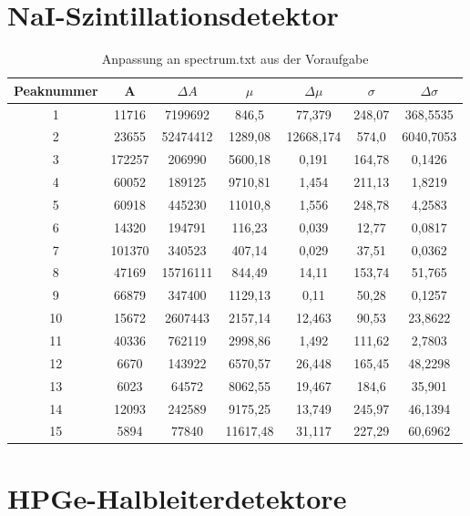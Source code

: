 \documentclass{article}
\begin{document}
\section{NaI-Szintillationsdetektor}

\begin{table}
  \centering
  \begin{tabular}{|c|c|c|c|c|c|c|} \hline
    Peaknummer & A & $\Delta A$ & $\mu$ & $\Delta \mu$ & $\sigma$ & $\Delta \sigma$\\ \hline \hline
    1 & 11716 & 7199692 & 846,5 & 77,379 & 248,07 & 368,5535 \\ \hline
    2 & 23655 & 52474412 & 1289,08 & 12668,174 & 574,0 & 6040,7053 \\ \hline
    3 & 172257 & 206990 & 5600,18 & 0,191 & 164,78 & 0,1426 \\ \hline
    4 & 60052 & 189125 & 9710,81 & 1,454 & 211,13 & 1,8219 \\ \hline
    5 & 60918 & 445230 & 11010,8 & 1,556 & 248,78 & 4,2583 \\ \hline
    6 & 14320 & 194791 & 116,23 & 0,039 & 12,77 & 0,0817 \\ \hline
    7 & 101370 & 340523 & 407,14 & 0,029 & 37,51 & 0,0362 \\ \hline
    8 & 47169 & 15716111 & 844,49 & 14,11 & 153,74 & 51,765 \\ \hline
    9 & 66879 & 347400 & 1129,13 & 0,11 & 50,28 & 0,1257 \\ \hline
    10 & 15672 & 2607443 & 2157,14 & 12,463 & 90,53 & 23,8622 \\ \hline
    11 & 40336 & 762119 & 2998,86 & 1,492 & 111,62 & 2,7803 \\ \hline
    12 & 6670 & 143922 & 6570,57 & 26,448 & 165,45 & 48,2298 \\ \hline
    13 & 6023 & 64572 & 8062,55 & 19,467 & 184,6 & 35,901 \\ \hline
    14 & 12093 & 242589 & 9175,25 & 13,749 & 245,97 & 46,1394 \\ \hline
    15 & 5894 & 77840 & 11617,48 & 31,117 & 227,29 & 60,6962 \\ \hline
  \end{tabular}
  \caption{Anpassung an spectrum.txt aus der Voraufgabe}
  \label{tab:voraufgabe}
\end{table}

\section{HPGe-Halbleiterdetektore}
\end{document}

